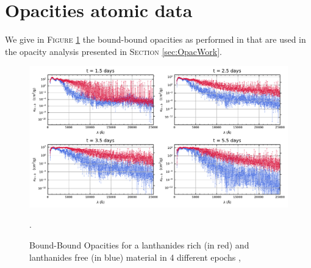 \documentclass[a4paper, twoside, 11pt]{article}
\numberwithin{equation}{section}
\begin{document}
\section{Opacities atomic data}
\label{appendix:opacTanaka}
We give in F\textsc{igure} \ref{fig:OpacBrut} the bound-bound opacities as performed in \cite{tanaka} that are used in the opacity analysis presented in S\textsc{ection} \ref{sec:OpacWork}.
\begin{figure}[!h]
\advance\leftskip-1.5cm
\includegraphics[scale=0.95]{pictures/opacTanaka_allepochs.pdf}
\caption[Bound-Bound Opacities from atomic data calculations]{Bound-Bound Opacities for a lanthanides rich (in red) and lanthanides free (in blue) material in 4 different epochs \cite{tanaka}, \cite{OpacRaw}}.
\label{fig:OpacBrut}
\end{figure}
\end{document}
